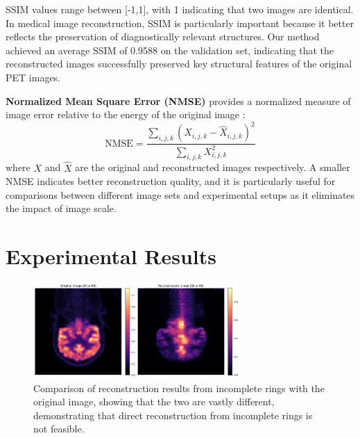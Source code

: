\documentclass[
reprint,
superscriptaddress,
nofootinbib,
amsmath,amssymb,
aps,
prd,
]{revtex4-2}
\begin{document}
SSIM values range between [-1,1], with 1 indicating that two images are identical. In medical image reconstruction, SSIM is particularly important because it better reflects the preservation of diagnostically relevant structures. Our method achieved an average SSIM of 0.9588 on the validation set, indicating that the reconstructed images successfully preserved key structural features of the original PET images.

\textbf{Normalized Mean Square Error (NMSE)} provides a normalized measure of image error relative to the energy of the original image \cite{Higashiyama2024NMSE}:
\begin{equation}
\text{NMSE} = \frac{\sum_{i,j,k}(X_{i,j,k} - \hat{X}_{i,j,k})^2}{\sum_{i,j,k}X_{i,j,k}^2}
\end{equation}
where $X$ and $\hat{X}$ are the original and reconstructed images respectively. A smaller NMSE indicates better reconstruction quality, and it is particularly useful for comparisons between different image sets and experimental setups as it eliminates the impact of image scale.




\section{Experimental Results}

\label{chap:results}



\begin{figure}[htbp]
    \centering
    \vspace{-0.2cm}
    \includegraphics[width=0.7\textwidth]{Images/output2}
    \vspace{-0.2cm}
    \caption{Comparison of reconstruction results from incomplete rings with the original image, showing that the two are vastly different, demonstrating that direct reconstruction from incomplete rings is not feasible.}
    \vspace{-0.2cm}
    \label{fig:pet_incomplete_reconstruction}
\end{figure}
\end{document}

